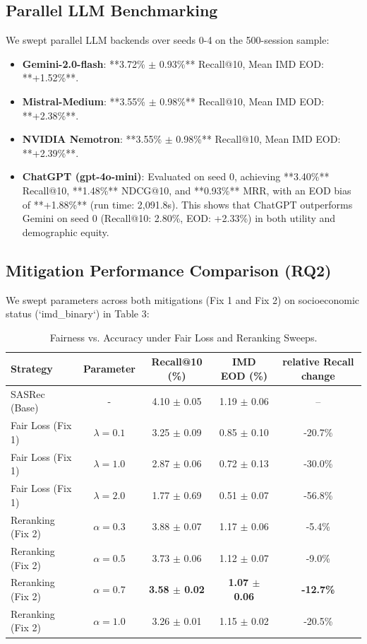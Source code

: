 \documentclass[10pt,journal,compsoc]{IEEEtran}
\begin{document}
\subsection{Parallel LLM Benchmarking}
We swept parallel LLM backends over seeds 0-4 on the 500-session sample:
\begin{itemize}
    \item \textbf{Gemini-2.0-flash}: **3.72\% $\pm$ 0.93\%** Recall@10, Mean IMD EOD: **+1.52\%**.
    \item \textbf{Mistral-Medium}: **3.55\% $\pm$ 0.98\%** Recall@10, Mean IMD EOD: **+2.38\%**.
    \item \textbf{NVIDIA Nemotron}: **3.55\% $\pm$ 0.98\%** Recall@10, Mean IMD EOD: **+2.39\%**.
    \item \textbf{ChatGPT (gpt-4o-mini)}: Evaluated on seed 0, achieving **3.40\%** Recall@10, **1.48\%** NDCG@10, and **0.93\%** MRR, with an EOD bias of **+1.88\%** (run time: 2,091.8s). This shows that ChatGPT outperforms Gemini on seed 0 (Recall@10: 2.80\%, EOD: +2.33\%) in both utility and demographic equity.
\end{itemize}

\subsection{Mitigation Performance Comparison (RQ2)}
We swept parameters across both mitigations (Fix 1 and Fix 2) on socioeconomic status (`imd_binary`) in Table 3:

\begin{table}[htbp]
\centering
\caption{Fairness vs. Accuracy under Fair Loss and Reranking Sweeps.}
\begin{tabular}{lcccc}
\toprule
Strategy & Parameter & Recall@10 (\%) & IMD EOD (\%) & relative Recall change \\
\midrule
SASRec (Base) & - & 4.10 $\pm$ 0.05 & 1.19 $\pm$ 0.06 & -- \\
Fair Loss (Fix 1) & $\lambda = 0.1$ & 3.25 $\pm$ 0.09 & 0.85 $\pm$ 0.10 & -20.7\% \\
Fair Loss (Fix 1) & $\lambda = 1.0$ & 2.87 $\pm$ 0.06 & 0.72 $\pm$ 0.13 & -30.0\% \\
Fair Loss (Fix 1) & $\lambda = 2.0$ & 1.77 $\pm$ 0.69 & 0.51 $\pm$ 0.07 & -56.8\% \\
\midrule
Reranking (Fix 2) & $\alpha = 0.3$ & 3.88 $\pm$ 0.07 & 1.17 $\pm$ 0.06 & -5.4\% \\
Reranking (Fix 2) & $\alpha = 0.5$ & 3.73 $\pm$ 0.06 & 1.12 $\pm$ 0.07 & -9.0\% \\
Reranking (Fix 2) & $\alpha = 0.7$ & \textbf{3.58 $\pm$ 0.02} & \textbf{1.07 $\pm$ 0.06} & \textbf{-12.7\%} \\
Reranking (Fix 2) & $\alpha = 1.0$ & 3.26 $\pm$ 0.01 & 1.15 $\pm$ 0.02 & -20.5\% \\
\bottomrule
\end{tabular}
\end{table}
\end{document}
